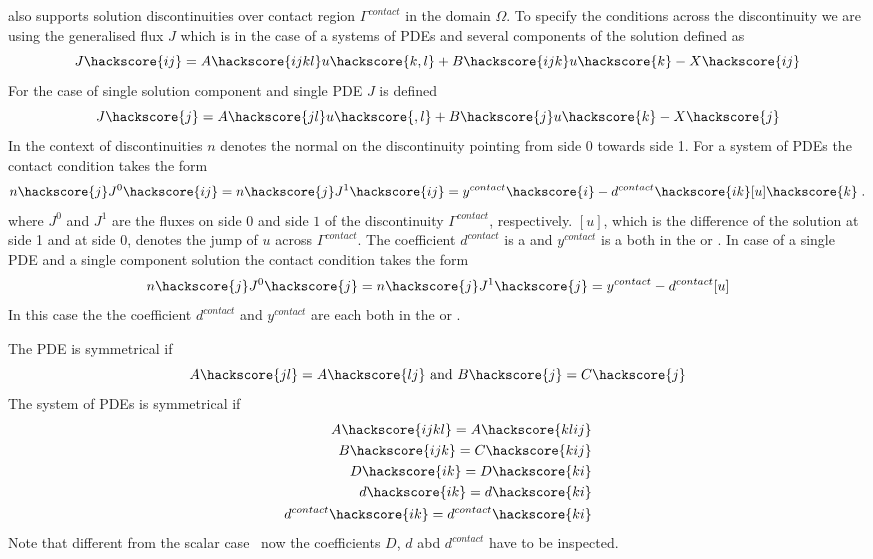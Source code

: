 \LinearPDE also supports solution discontinuities  over contact region $\Gamma^{contact}$
in the domain $\Omega$. To specify the conditions across the discontinuity we are using the
generalised flux $J$ which is in the case of a systems of PDEs and several components of the solution
defined as
\begin{equation}\label{LINEARPDE.SYSTEM.5}
J\hackscore{ij}=A\hackscore{ijkl}u\hackscore{k,l}+B\hackscore{ijk}u\hackscore{k}-X\hackscore{ij}
\end{equation}
For the case of single solution component and single PDE $J$ is defined
\begin{equation}\label{LINEARPDE.SINGLE.5}
J\hackscore{j}=A\hackscore{jl}u\hackscore{,l}+B\hackscore{j}u\hackscore{k}-X\hackscore{j}
\end{equation}
In the context of discontinuities  $n$ denotes the normal on the
discontinuity pointing from side 0 towards side 1. For a system of PDEs
the contact condition takes the form
\begin{equation}\label{LINEARPDE.SYSTEM.6}
n\hackscore{j} J^{0}\hackscore{ij}=n\hackscore{j} J^{1}\hackscore{ij}=y^{contact}\hackscore{i} - d^{contact}\hackscore{ik} [u]\hackscore{k} \; .
\end{equation}
where $J^{0}$ and $J^{1}$ are the fluxes on side $0$ and side $1$ of the
discontinuity $\Gamma^{contact}$, respectively. $[u]$, which is the difference
of the solution at side 1 and at side 0, denotes the jump of $u$ across $\Gamma^{contact}$.
The coefficient $d^{contact}$ is a \RankTwo and $y^{contact}$ is a
\RankOne both in the \FunctionOnContactZero or \FunctionOnContactOne.
In case of a single PDE and a single component solution the contact condition takes the form
\begin{equation}\label{LINEARPDE.SINGLE.6}
n\hackscore{j} J^{0}\hackscore{j}=n\hackscore{j} J^{1}\hackscore{j}=y^{contact} - d^{contact}[u]
\end{equation}
In this case the the coefficient $d^{contact}$ and $y^{contact}$ are each \Scalar
both in the \FunctionOnContactZero or \FunctionOnContactOne.

The PDE is symmetrical  if
\begin{equation}\label{LINEARPDE.SINGLE.4}
A\hackscore{jl}=A\hackscore{lj} \mbox{ and } B\hackscore{j}=C\hackscore{j}
\end{equation}
The system of PDEs is symmetrical  if
\begin{eqnarray}
\label{LINEARPDE.SYSTEM.4}
A\hackscore{ijkl}=A\hackscore{klij} \\
B\hackscore{ijk}=C\hackscore{kij} \\
D\hackscore{ik}=D\hackscore{ki} \\
d\hackscore{ik}=d\hackscore{ki} \\
d^{contact}\hackscore{ik}=d^{contact}\hackscore{ki}
\end{eqnarray}
Note that different from the scalar case~ now the coefficients $D$, $d$ abd $d^{contact}$
have to be inspected.


